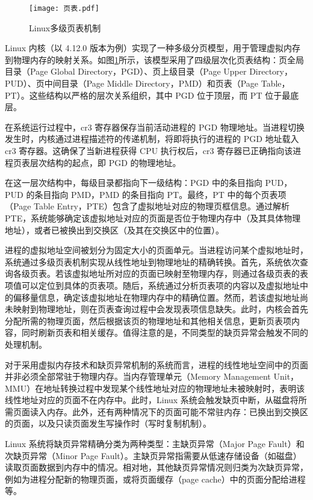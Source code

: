 \begin{figure}[h]
    \centering
    \texttt{[image: 页表.pdf]}
    \caption{Linux多级页表机制}
    \label{页表}
\end{figure}

Linux 内核（以 4.12.0 版本为例）实现了一种多级分页模型，用于管理虚拟内存到物理内存的映射关系。如图\ref{页表}所示，该模型采用了四级层次化页表结构：页全局目录（Page Global Directory，PGD）、页上级目录（Page Upper Directory，PUD）、页中间目录（Page Middle Directory，PMD）和页表（Page Table，PT）。这些结构以严格的层次关系组织，其中 PGD 位于顶层，而 PT 位于最底层。

在系统运行过程中，cr3 寄存器保存当前活动进程的 PGD 物理地址。当进程切换发生时，内核通过进程描述符的传递机制，将即将执行的进程的 PGD 地址载入 cr3 寄存器。这确保了当新进程获得 CPU 执行权后，cr3 寄存器已正确指向该进程页表层次结构的起点，即 PGD 的物理地址。

在这一层次结构中，每级目录都指向下一级结构：PGD 中的条目指向 PUD，PUD 的条目指向 PMD，PMD 的条目指向 PT。最终，PT 中的每个页表项（Page Table Entry，PTE）包含了虚拟地址对应的物理页框信息。通过解析 PTE，系统能够确定该虚拟地址对应的页面是否位于物理内存中（及其具体物理地址），或者已被换出到交换区（及其在交换区中的位置）。

进程的虚拟地址空间被划分为固定大小的页面单元。当进程访问某个虚拟地址时，系统通过多级页表机制实现从线性地址到物理地址的精确转换。首先，系统依次查询各级页表。若该虚拟地址所对应的页面已映射至物理内存，则通过各级页表的表项值可以定位到具体的页表项。随后，系统通过分析页表项的内容以及虚拟地址中的偏移量信息，确定该虚拟地址在物理内存中的精确位置。然而，若该虚拟地址尚未映射到物理地址，则在页表查询过程中会发现表项信息缺失。此时，内核会首先分配所需的物理页面，然后根据该页的物理地址和其他相关信息，更新页表项内容，同时刷新页表和相关缓存。值得注意的是，不同类型的缺页异常会触发不同的处理机制。

对于采用虚拟内存技术和缺页异常机制的系统而言，进程的线性地址空间中的页面并非必须全部常驻于物理内存。当内存管理单元（Memory Management Unit，MMU）在地址转换过程中发现某个线性地址对应的物理地址未被映射时，表明该线性地址对应的页面不在内存中。此时，Linux 系统会触发缺页中断，从磁盘将所需页面读入内存。此外，还有两种情况下的页面可能不常驻内存：已换出到交换区的页面，以及只读页面发生写操作时（写时复制机制）。

Linux 系统将缺页异常精确分类为两种类型：主缺页异常（Major Page Fault）和次缺页异常（Minor Page Fault）。主缺页异常指需要从低速存储设备（如磁盘）读取页面数据到内存中的情况。相对地，其他缺页异常情况则归类为次缺页异常，例如为进程分配新的物理页面，或将页面缓存（page cache）中的页面分配给进程等。

